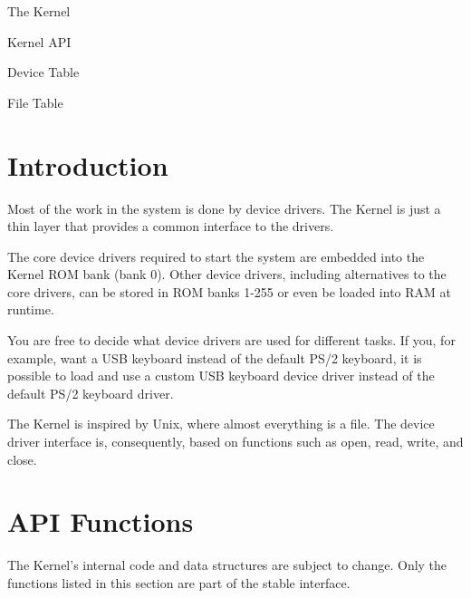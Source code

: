 \begin{chapterpage}{The Kernel}
    \begin{chapteritems}
        \item Kernel API
        \item Device Table
        \item File Table 
    \end{chapteritems}
\end{chapterpage}

\section{Introduction}

Most of the work in the system is done by device drivers. The Kernel is
just a thin layer that provides a common interface to the drivers.

The core device drivers required to start the system are embedded into the Kernel ROM bank (bank 0).
Other device drivers, including alternatives to the core drivers, can be stored
in ROM banks 1-255 or even be loaded into RAM at runtime.

You are free to decide what device drivers are used for different tasks. If you, for example, want 
a USB keyboard instead of the default PS/2 keyboard, it is possible to load and use a custom USB 
keyboard device driver instead of the default PS/2 keyboard driver.

The Kernel is inspired by Unix, where almost everything is a file. The device driver interface is, 
consequently, based on functions such as open, read, write, and close.


\section{API Functions}

The Kernel's internal code and data structures are subject to change. 
Only the functions listed in this section are part of the stable interface.

